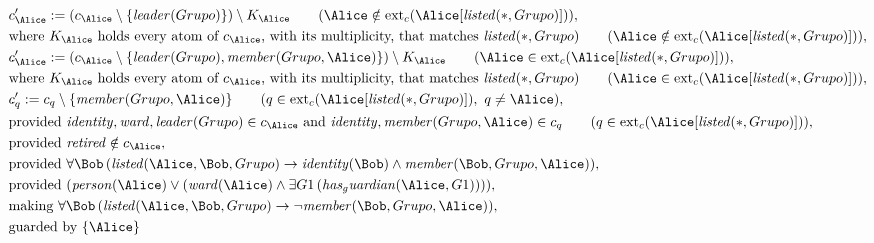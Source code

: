 \begin{align*}
&
c'_
{
\Alice
}
 := 
(c_
{
\Alice
}
 \setminus 
\{
\mathit{
leader
}
(
Grupo
)
\}
) \setminus K_
{
\Alice
}
 \qquad (
\Alice
 \notin 
\mathrm{ext}_c(
\Alice
[
\mathit{
listed
}
(
\ast
,
Grupo
)
]
)
)
,\\
&
\text{where } K_
{
\Alice
}
 \text{ holds every atom of } c_
{
\Alice
}
 \text{, with its multiplicity, that matches } 
\mathit{
listed
}
(
\ast
,
Grupo
)
 \qquad (
\Alice
 \notin 
\mathrm{ext}_c(
\Alice
[
\mathit{
listed
}
(
\ast
,
Grupo
)
]
)
)
,\\
&
c'_
{
\Alice
}
 := 
(c_
{
\Alice
}
 \setminus 
\{
\mathit{
leader
}
(
Grupo
)
,
\mathit{
member
}
(
Grupo
,
\Alice
)
\}
) \setminus K_
{
\Alice
}
 \qquad (
\Alice
 \in 
\mathrm{ext}_c(
\Alice
[
\mathit{
listed
}
(
\ast
,
Grupo
)
]
)
)
,\\
&
\text{where } K_
{
\Alice
}
 \text{ holds every atom of } c_
{
\Alice
}
 \text{, with its multiplicity, that matches } 
\mathit{
listed
}
(
\ast
,
Grupo
)
 \qquad (
\Alice
 \in 
\mathrm{ext}_c(
\Alice
[
\mathit{
listed
}
(
\ast
,
Grupo
)
]
)
)
,\\
&
c'_
q
 := 
c_
q
 \setminus 
\{
\mathit{
member
}
(
Grupo
,
\Alice
)
\}
 \qquad (
q
 \in 
\mathrm{ext}_c(
\Alice
[
\mathit{
listed
}
(
\ast
,
Grupo
)
]
)
,\ 
q \neq 
\Alice
)
,\\
&
\text{provided } 
\mathit{
identity
}
,
\mathit{
ward
}
,
\mathit{
leader
}
(
Grupo
)
 \in c_
{
\Alice
}
 \text{ and } 
\mathit{
identity
}
,
\mathit{
member
}
(
Grupo
,
\Alice
)
 \in c_
q
 \qquad (
q \in 
\mathrm{ext}_c(
\Alice
[
\mathit{
listed
}
(
\ast
,
Grupo
)
]
)
)
,\\
&
\text{provided } 
\mathit{
retired
}
 \notin c_
{
\Alice
}
,\\
&
\text{provided } 
\forall 
\Bob
\,(
\mathit{
listed
}
(
\Alice
,
\Bob
,
Grupo
)
\rightarrow
\mathit{
identity
}
(
\Bob
)
\land
\mathit{
member
}
(
\Bob
,
Grupo
,
\Alice
)
)
,\\
&
\text{provided } 
(
\mathit{
person
}
(
\Alice
)
\lor
(
\mathit{
ward
}
(
\Alice
)
\land
\exists 
G1
\,(
\mathit{
has_guardian
}
(
\Alice
,
G1
)
)
)
)
,\\
&
\text{making } 
\forall 
\Bob
\,(
\mathit{
listed
}
(
\Alice
,
\Bob
,
Grupo
)
\rightarrow
\neg 
\mathit{
member
}
(
\Bob
,
Grupo
,
\Alice
)
)
,\\
&
\text{guarded by } \{
\Alice
\}
\end{align*}

